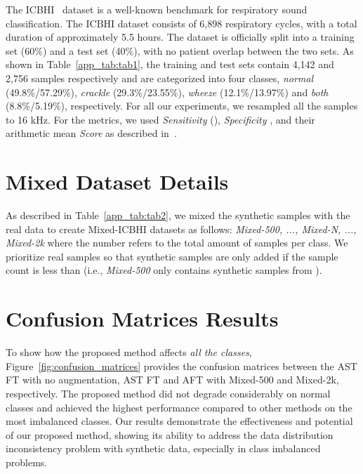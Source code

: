 \documentclass{article}
\begin{document}
 The ICBHI~\cite{rocha2018alpha} dataset is a well-known benchmark for respiratory sound classification. The ICBHI dataset consists of 6,898 respiratory cycles, with a total duration of approximately 5.5 hours. The dataset is officially split into a training set (60\%) and a test set (40\%), with no patient overlap between the two sets. As shown in Table~\ref{app_tab:tab1}, the training and test sets contain 4,142 and 2,756 samples respectively and are categorized into four classes, \emph{normal} (49.8\%/57.29\%), \emph{crackle} (29.3\%/23.55\%), \emph{wheeze} (12.1\%/13.97\%) and \emph{both} (8.8\%/5.19\%), respectively. For all our experiments, we resampled all the samples to 16 kHz. For the metrics, we used \textit{Sensitivity} (), \textit{Specificity} , and their arithmetic mean \textit{Score} as described in~\cite{rocha2018alpha}.



\section{Mixed Dataset Details}
\label{appendix_mixed_dataset}
As described in Table~\ref{app_tab:tab2}, we mixed the synthetic samples with the real data to create Mixed-ICBHI datasets as follows: \emph{Mixed-500, ..., Mixed-N, ..., Mixed-2k} where the number  refers to the total amount of samples per class. We prioritize real samples so that synthetic samples are only added if the sample count is less than  (i.e., \emph{Mixed-500} only contains synthetic samples from ).

\section{Confusion Matrices Results}
\label{appendix_confusion}
To show how the proposed method affects \emph{all the classes}, Figure~\ref{fig:confusion_matrices} provides the confusion matrices between the AST FT with no augmentation, AST FT and AFT with Mixed-500 and Mixed-2k, respectively. The proposed method did not degrade considerably on normal classes and achieved the highest performance compared to other methods on the most imbalanced classes. Our results demonstrate the effectiveness and potential of our proposed method, showing its ability to address the data distribution inconsistency problem with synthetic data, especially in class imbalanced problems.
\end{document}

